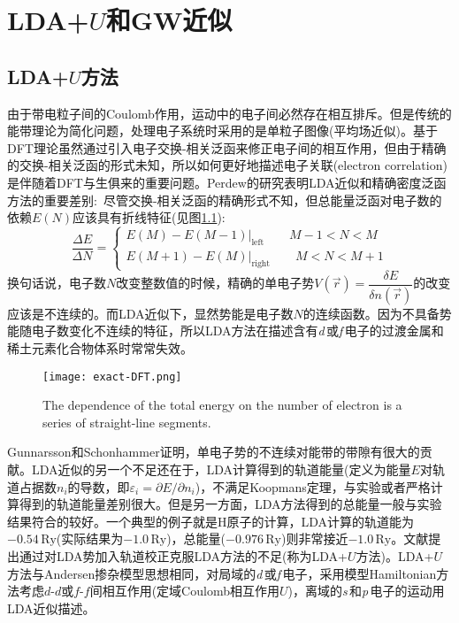 \chapter{LDA+$U$和GW近似}
\section{LDA+$U$方法}
由于带电粒子间的\textrm{Coulomb}作用，运动中的电子间必然存在相互排斥。但是传统的能带理论为简化问题，处理电子系统时采用的是单粒子图像(平均场近似)。基于\textrm{DFT}理论虽然通过引入电子交换-相关泛函来修正电子间的相互作用，但由于精确的交换-相关泛函的形式未知，所以如何更好地描述电子关联(electron correlation)是伴随着\textrm{DFT}与生俱来的重要问题。\textrm{Perdew}的研究表明LDA近似和精确密度泛函方法的重要差别\cite{PRL49-1691_1982}:~尽管交换-相关泛函的精确形式不知，但总能量泛函对电子数的依赖$E(N)$应该具有折线特征(见图\ref{exact-DFT}):~
	\begin{displaymath}
		\dfrac{\Delta E}{\Delta N}=\left\{
		\begin{aligned}
			E(M)-E(M-1)|_{\mathrm{left}}\qquad M-1<N<M\\
			E(M+1)-E(M)|_{\mathrm{right}}\qquad M<N<M+1 
		\end{aligned}\right.
	\end{displaymath}
换句话说，电子数$N$改变整数值的时候，精确的单电子势$V(\vec r)=\dfrac{\delta E}{\delta n(\vec r)}$的改变应该是不连续的。而LDA近似下，显然势能是电子数$N$的连续函数。因为不具备势能随电子数变化不连续的特征，所以LDA方法在描述含有{\textit d}\,或{\textit f}\,电子的过渡金属和稀土元素化合物体系时常常失效。

\begin{figure}[h!]
\centering
\vspace*{-0.4in}
\texttt{[image: exact-DFT.png]}
\caption{\small \textrm{The dependence of the total energy on the number of electron is a series of straight-line segments.}}%
\label{exact-DFT}
\end{figure}

Gunnarsson和Schonhammer\cite{PRL56-1968_1986}证明，单电子势的不连续对能带的带隙有很大的贡献。LDA近似的另一个不足还在于，LDA计算得到的轨道能量(定义为能量$E$对轨道占据数$n_i$的导数，即$\varepsilon_i=\partial E/\partial n_i$)，不满足\textrm{Koopmans}定理，与实验或者严格计算得到的轨道能量差别很大。但是另一方面，LDA方法得到的总能量一般与实验结果符合的较好。一个典型的例子就是\textrm{H}原子的计算，LDA计算的轨道能为$-0.54\,\mathrm{Ry}$(实际结果为$-1.0\,\mathrm{Ry}$)，总能量($-0.976\,\mathrm{Ry}$)则非常接近$-1.0\,\mathrm{Ry}$\cite{PRB37-9919_1988}。文献提出通过对LDA势加入轨道校正克服LDA方法的不足(称为LDA+$U$方法)。LDA+$U$方法与\textrm{Andersen}掺杂模型\cite{PR124-41_1961}思想相同，对局域的{\textit d}\,或{\textit f}\,电子，采用模型Hamiltonian方法考虑$d$-$d$或$f$-$f$间相互作用(定域Coulomb相互作用$U$)，离域的{\textit s}\,和{\textit p}\,电子的运动用LDA近似描述。


